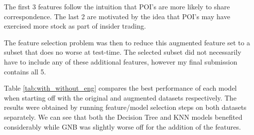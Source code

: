 \documentclass{article}
\begin{document}
The first 3 features follow the intuition that POI's are more likely to share correspondence. The last 2 are motivated by the idea that POI's may have exercised more stock as part of insider trading.

The feature selection problem was then to reduce this augmented feature set to a subset that does no worse at test-time. The selected subset did not necessarily have to include any of these additional features, however my final submission contains all 5.

Table \ref{tab:with_without_eng} compares the best performance of each model when starting off with the original and augmented datasets respectively. The results were obtained by running feature/model selection steps on both datasets separately. We can see that both the Decision Tree and KNN models benefited considerably while GNB was slightly worse off for the addition of the features.
\end{document}

